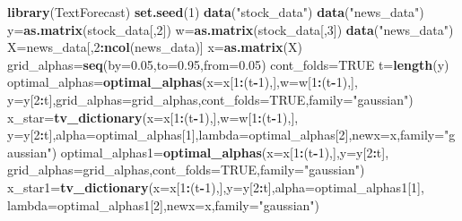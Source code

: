 \documentclass[]{article}
\newenvironment{Shaded}{\begin{snugshade}}{\end{snugshade}}
\newcommand{\KeywordTok}[1]{\textcolor[rgb]{0.13,0.29,0.53}{\textbf{#1}}}
\newcommand{\DataTypeTok}[1]{\textcolor[rgb]{0.13,0.29,0.53}{#1}}
\newcommand{\DecValTok}[1]{\textcolor[rgb]{0.00,0.00,0.81}{#1}}
\newcommand{\FloatTok}[1]{\textcolor[rgb]{0.00,0.00,0.81}{#1}}
\newcommand{\StringTok}[1]{\textcolor[rgb]{0.31,0.60,0.02}{#1}}
\newcommand{\OtherTok}[1]{\textcolor[rgb]{0.56,0.35,0.01}{#1}}
\newcommand{\OperatorTok}[1]{\textcolor[rgb]{0.81,0.36,0.00}{\textbf{#1}}}
\newcommand{\NormalTok}[1]{#1}
\begin{document}
\begin{Shaded}
\begin{Highlighting}[]
 \KeywordTok{library}\NormalTok{(TextForecast)}
 \KeywordTok{set.seed}\NormalTok{(}\DecValTok{1}\NormalTok{)}
 \KeywordTok{data}\NormalTok{(}\StringTok{"stock_data"}\NormalTok{)}
 \KeywordTok{data}\NormalTok{(}\StringTok{"news_data"}\NormalTok{)}
\NormalTok{ y=}\KeywordTok{as.matrix}\NormalTok{(stock_data[,}\DecValTok{2}\NormalTok{])}
\NormalTok{ w=}\KeywordTok{as.matrix}\NormalTok{(stock_data[,}\DecValTok{3}\NormalTok{])}
 \KeywordTok{data}\NormalTok{(}\StringTok{"news_data"}\NormalTok{)}
\NormalTok{ X=news_data[,}\DecValTok{2}\OperatorTok{:}\KeywordTok{ncol}\NormalTok{(news_data)]}
\NormalTok{ x=}\KeywordTok{as.matrix}\NormalTok{(X)}
\NormalTok{ grid_alphas=}\KeywordTok{seq}\NormalTok{(}\DataTypeTok{by=}\FloatTok{0.05}\NormalTok{,}\DataTypeTok{to=}\FloatTok{0.95}\NormalTok{,}\DataTypeTok{from=}\FloatTok{0.05}\NormalTok{)}
\NormalTok{ cont_folds=}\OtherTok{TRUE}
\NormalTok{ t=}\KeywordTok{length}\NormalTok{(y)}
\NormalTok{ optimal_alphas=}\KeywordTok{optimal_alphas}\NormalTok{(}\DataTypeTok{x=}\NormalTok{x[}\DecValTok{1}\OperatorTok{:}\NormalTok{(t}\OperatorTok{-}\DecValTok{1}\NormalTok{),],}\DataTypeTok{w=}\NormalTok{w[}\DecValTok{1}\OperatorTok{:}\NormalTok{(t}\OperatorTok{-}\DecValTok{1}\NormalTok{),],}
 \DataTypeTok{y=}\NormalTok{y[}\DecValTok{2}\OperatorTok{:}\NormalTok{t],}\DataTypeTok{grid_alphas=}\NormalTok{grid_alphas,}\DataTypeTok{cont_folds=}\OtherTok{TRUE}\NormalTok{,}\DataTypeTok{family=}\StringTok{"gaussian"}\NormalTok{)}
\NormalTok{ x_star=}\KeywordTok{tv_dictionary}\NormalTok{(}\DataTypeTok{x=}\NormalTok{x[}\DecValTok{1}\OperatorTok{:}\NormalTok{(t}\OperatorTok{-}\DecValTok{1}\NormalTok{),],}\DataTypeTok{w=}\NormalTok{w[}\DecValTok{1}\OperatorTok{:}\NormalTok{(t}\OperatorTok{-}\DecValTok{1}\NormalTok{),],}
 \DataTypeTok{y=}\NormalTok{y[}\DecValTok{2}\OperatorTok{:}\NormalTok{t],}\DataTypeTok{alpha=}\NormalTok{optimal_alphas[}\DecValTok{1}\NormalTok{],}\DataTypeTok{lambda=}\NormalTok{optimal_alphas[}\DecValTok{2}\NormalTok{],}\DataTypeTok{newx=}\NormalTok{x,}\DataTypeTok{family=}\StringTok{"gaussian"}\NormalTok{)}
\NormalTok{ optimal_alphas1=}\KeywordTok{optimal_alphas}\NormalTok{(}\DataTypeTok{x=}\NormalTok{x[}\DecValTok{1}\OperatorTok{:}\NormalTok{(t}\OperatorTok{-}\DecValTok{1}\NormalTok{),],}\DataTypeTok{y=}\NormalTok{y[}\DecValTok{2}\OperatorTok{:}\NormalTok{t],}
 \DataTypeTok{grid_alphas=}\NormalTok{grid_alphas,}\DataTypeTok{cont_folds=}\OtherTok{TRUE}\NormalTok{,}\DataTypeTok{family=}\StringTok{"gaussian"}\NormalTok{)}
\NormalTok{ x_star1=}\KeywordTok{tv_dictionary}\NormalTok{(}\DataTypeTok{x=}\NormalTok{x[}\DecValTok{1}\OperatorTok{:}\NormalTok{(t}\OperatorTok{-}\DecValTok{1}\NormalTok{),],}\DataTypeTok{y=}\NormalTok{y[}\DecValTok{2}\OperatorTok{:}\NormalTok{t],}\DataTypeTok{alpha=}\NormalTok{optimal_alphas1[}\DecValTok{1}\NormalTok{],}
 \DataTypeTok{lambda=}\NormalTok{optimal_alphas1[}\DecValTok{2}\NormalTok{],}\DataTypeTok{newx=}\NormalTok{x,}\DataTypeTok{family=}\StringTok{"gaussian"}\NormalTok{)}
\end{Highlighting}
\end{Shaded}
\end{document}
